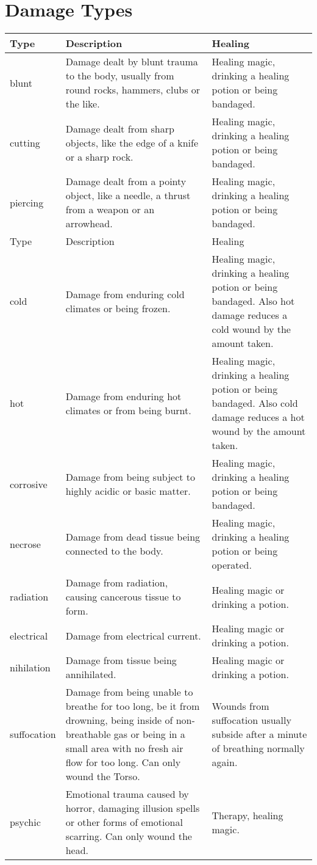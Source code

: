\chapter{Damage Types}
\begin{longtable}{l p{5cm} p{5cm}}
Type & Description & Healing \\ \hline
blunt  & Damage dealt by blunt trauma to the body, usually from round rocks, hammers, clubs or the like. & Healing magic, drinking a healing potion or being bandaged. \\
cutting & Damage dealt from sharp objects, like the edge of a knife or a sharp rock. & Healing magic, drinking a healing potion or being bandaged. \\
piercing & Damage dealt from a pointy object, like a needle, a thrust from a weapon or an arrowhead. & Healing magic, drinking a healing potion or being bandaged. \\
Type & Description & Healing \\ \hline
cold & Damage from enduring cold climates or being frozen. & Healing magic, drinking a healing potion or being bandaged. Also hot damage reduces a cold wound by the amount taken. \\
hot & Damage from enduring hot climates or from being burnt. & Healing magic, drinking a healing potion or being bandaged. Also cold damage reduces a hot wound by the amount taken. \\
corrosive & Damage from being subject to highly acidic or basic matter. & Healing magic, drinking a healing potion or being bandaged. \\
necrose & Damage from dead tissue being connected to the body. & Healing magic, drinking a healing potion or being operated. \\
radiation & Damage from radiation, causing cancerous tissue to form. & Healing magic or drinking a potion. \\
electrical & Damage from electrical current. & Healing magic or drinking a potion. \\
nihilation & Damage from tissue being annihilated. & Healing magic or drinking a potion. \\
suffocation & Damage from being unable to breathe for too long, be it from drowning, being inside of non-breathable gas or being in a small area with no fresh air flow for too long. Can only wound the Torso. & Wounds from suffocation usually subside after a minute of breathing normally again. \\
psychic & Emotional trauma caused by horror, damaging illusion spells or other forms of emotional scarring. Can only wound the head. & Therapy, healing magic. \\

\end{longtable}
